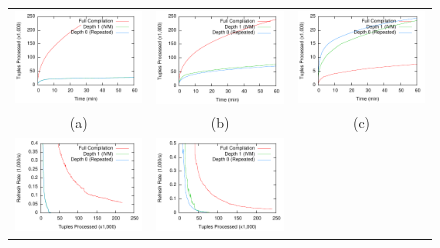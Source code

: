\begin{figure}
\begin{center}
\begin{tabular}{ccc}
\includegraphics[width=2.2in]{../graphs/graphs/time_serverload.pdf} &
\includegraphics[width=2.2in]{../graphs/graphs/time_tpch17.pdf} &
\includegraphics[width=2.2in]{../graphs/graphs/time_tpch18.pdf} \\
(a) & (b) & (c) \\
\includegraphics[width=2.2in]{../graphs/graphs/windowedrate_serverload.pdf} &
\includegraphics[width=2.2in]{../graphs/graphs/windowedrate_tpch17.pdf} &

\end{tabular}
\end{center}
\end{figure}
